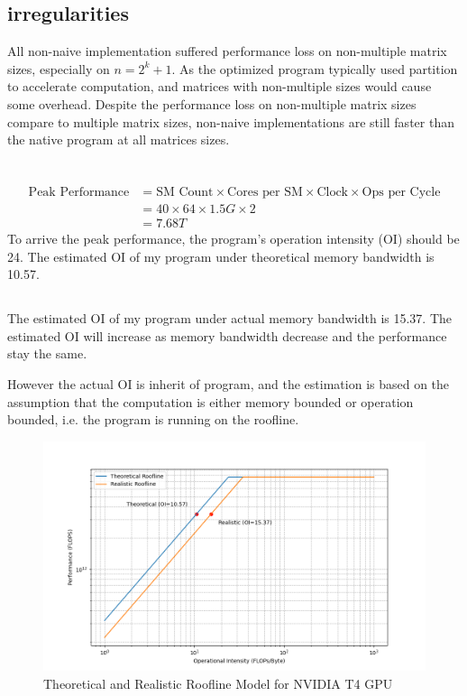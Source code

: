 \documentclass{article}
\begin{document}
\subsection{irregularities}
All non-naive implementation suffered performance loss 
on non-multiple matrix sizes, especially on $n=2^k+1$.
As the optimized program typically used partition to accelerate computation, and 
matrices with non-multiple sizes would cause some overhead.
Despite the performance loss on non-multiple matrix sizes compare to multiple matrix sizes, 
non-naive implementations are still faster than the native program at all matrices sizes.

\section{}
\subsection{}
$$
\begin{aligned}
\text{Peak Performance} 
    &= \text{SM Count} \times \text{Cores per SM} \times \text{Clock} \times \text{Ops per Cycle}\\
    &=40\times 64 \times 1.5G \times 2 \\
    &=7.68T
\end{aligned}
$$
To arrive the peak performance, the program's operation intensity (OI) should be 24.
The estimated OI of my program under theoretical memory bandwidth is 10.57.

\subsection{}
The estimated OI of my program under actual memory bandwidth is 15.37.
The estimated OI will increase as 
memory bandwidth decrease and the performance stay the same.

However the actual OI is inherit of program, 
and the estimation is based on the assumption that
the computation is either memory bounded or operation bounded,
i.e. the program is running on the roofline.

\begin{figure}[h]
    \centering
    \includegraphics[width=\linewidth]{img/roofline.png}
    \caption{Theoretical and Realistic Roofline Model for NVIDIA T4 GPU}
    \label{fig:roofline}
\end{figure}
\end{document}
